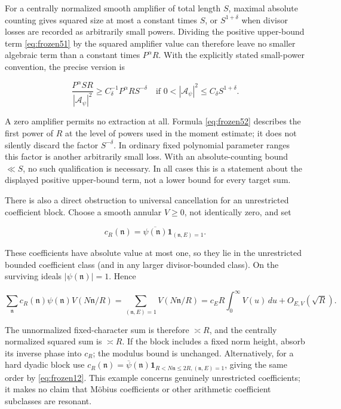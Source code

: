 \documentclass[11pt]{article}
\theoremstyle{remark}\newtheorem{remark}[theorem]{Remark}
\begin{document}
For a centrally normalized smooth amplifier of total length \(S\), maximal absolute counting gives squared size at most a constant times \(S\), or \(S^{1+\delta}\) when divisor losses are recorded as arbitrarily small powers. Dividing the positive upper-bound term \eqref{eq:frozen51} by the squared amplifier value can therefore leave no smaller algebraic term than a constant times \(P^\alpha R\). With the explicitly stated small-power convention, the precise version is

\begin{equation}
\frac{P^\alpha SR}{|\mathcal A_\psi|^2}
\ge C_\delta^{-1}P^\alpha R S^{-\delta}
\quad\text{if }0<|\mathcal A_\psi|^2\le C_\delta S^{1+\delta}.
\label{eq:frozen52}
\end{equation}

A zero amplifier permits no extraction at all. Formula \eqref{eq:frozen52} describes the first power of \(R\) at the level of powers used in the moment estimate; it does not silently discard the factor \(S^{-\delta}\). In ordinary fixed polynomial parameter ranges this factor is another arbitrarily small loss. With an absolute-counting bound \(\ll S\), no such qualification is necessary. In all cases this is a statement about the displayed positive upper-bound term, not a lower bound for every target sum.

There is also a direct obstruction to universal cancellation for an unrestricted coefficient block. Choose a smooth annular \(V\ge0\), not identically zero, and set

\[
c_R(\mathfrak n)=\overline{\psi(\mathfrak n)}
\mathbf1_{(\mathfrak n,E)=1}.
\]

These coefficients have absolute value at most one, so they lie in the unrestricted bounded coefficient class (and in any larger divisor-bounded class). On the surviving ideals \(|\psi(\mathfrak n)|=1\). Hence

\begin{equation}
\sum_{\mathfrak n}c_R(\mathfrak n)\psi(\mathfrak n)V(N\mathfrak n/R)
=\sum_{(\mathfrak n,E)=1}V(N\mathfrak n/R)
=c_E R\int_0^\infty V(u)\,du+O_{E,V}(\sqrt R).
\label{eq:frozen53}
\end{equation}

The unnormalized fixed-character sum is therefore \(\asymp R\), and the centrally normalized squared sum is \(\asymp R\). If the block includes a fixed norm height, absorb its inverse phase into \(c_R\); the modulus bound is unchanged. Alternatively, for a hard dyadic block use \(c_R(\mathfrak n)=\overline\psi(\mathfrak n)\mathbf1_{R<N\mathfrak n\le2R,(\mathfrak n,E)=1}\), giving the same order by \eqref{eq:frozen12}. This example concerns genuinely unrestricted coefficients; it makes no claim that Möbius coefficients or other arithmetic coefficient subclasses are resonant.
\end{document}
